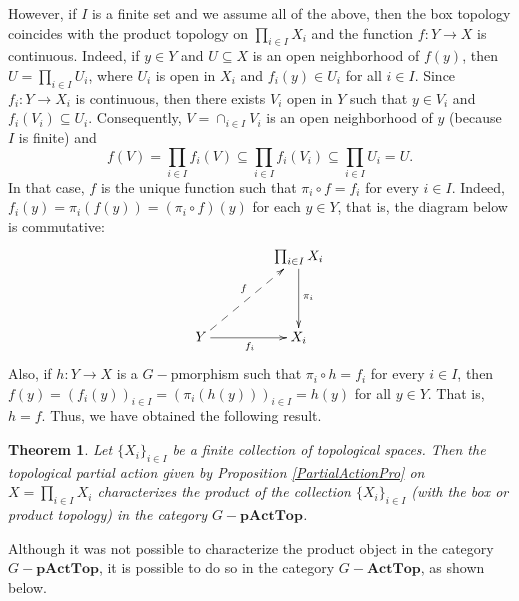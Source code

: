 \documentclass[sn-mathphys-num]{sn-jnl}%
\theoremstyle{thmstyleone}%
\newtheorem{theorem}{Theorem}%
\theoremstyle{thmstyletwo}%
\theoremstyle{thmstylethree}%
\begin{document}
However, if $I$ is a finite set and we assume all of the above, then the box topology  coincides with the product topology on  $ \prod_{i \in I}X_i$ and the function $ f: Y \to X $ is continuous. Indeed, if $y\in Y$ and $U\subseteq X$ is an open neighborhood  of $f(y)$, then $U=\prod_{i \in I}U_i$, where $U_i$ is open in $X_i$  and $f_i(y)\in U_i$ for all $i\in I$. Since 
$f_{i}:Y \to X_i $ is continuous, then there exists $V_{i}$ open in $Y$ such that $y\in V_{i}$ and $f_{i}(V_{i})\subseteq U_i$. Consequently, $V=\cap_{i \in I}V_i$ is an open neighborhood of $y$ (because $I$ is finite) and $$f(V)=  \prod_{i \in I} f_i(V) \subseteq \prod_{i \in I} f_i(V_i) \subseteq  \prod_{i \in I}  U_i=U.$$
In that case, $ f $ is the unique function such that $ \pi_i \circ f = f_i $ for every $ i \in I $. Indeed,  $ f_i (y) = \pi_i (f (y)) = (\pi_i \circ f) (y) $ for each $ y \in Y $, that is, the diagram below is commutative:
$$
\xymatrix@=1.5cm{
 & \prod_{i \in I}X_i\ar[d]^{\pi_i}\\
Y \ar@{-->}[ur]^f \ar[r]_{f_i}&X_i
}
$$
Also, if $ h: Y \to X $ is a $G-$pmorphism such that $ \pi_i \circ h = f_i $ for every $ i \in I $, then $ f (y) = (f_i (y))_{i \in I} = (\pi_i(h (y)))_{ i \in I} = h (y) $ for all $ y \in Y $. That is, $ h = f $. Thus, we have obtained the following result.\\

\begin{theorem}\label{charprod}
Let $ \{X_i \}_{i \in I} $ be a finite collection of topological spaces. Then the topological  partial action given by Proposition \ref{PartialActionPro} on 
  $ X = \prod_{i \in I} X_i $ characterizes the product of the collection $ \{X_i \}_{i \in I} $ (with the box or product topology) in the category $G-\mathbf{pActTop}$.\\
\end{theorem}


Although it was not possible to characterize the product object in the category $G-\mathbf{pActTop}$, it is possible to do so in the category $G-\mathbf{ActTop}$, as shown below.\\
\end{document}
